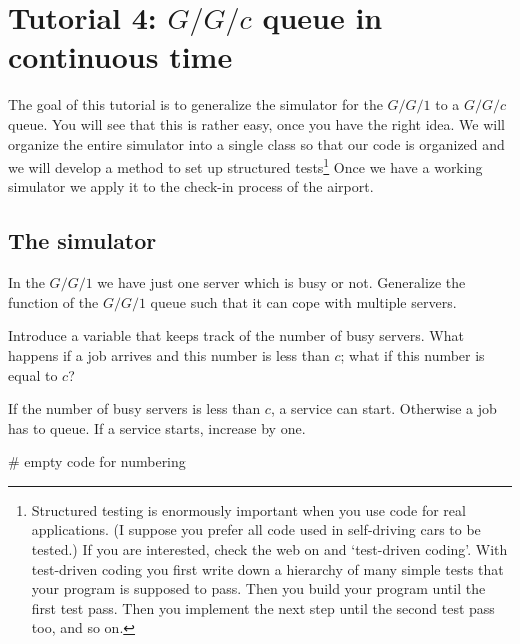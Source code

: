 \section{Tutorial 4: $G/G/c$ queue in continuous time}
\label{sec:ggc-continuous-time}

The goal of this tutorial is to  generalize the simulator for the $G/G/1$ to a $G/G/c$ queue. You will see that this is rather easy, once you have the right idea. We will organize the entire simulator into a single class so that our code is organized and we will develop a method to set up structured  tests\footnote{Structured testing is enormously important when you use code for real applications. (I suppose you prefer all code used in self-driving cars to be tested.)  If you are interested, check the web on   and `test-driven coding'. With test-driven coding you first write down a hierarchy of  many simple tests that your program is supposed to pass.  Then you build your program until the first test pass. Then you implement the next step until the second test pass too, and so on.} Once we have a working simulator we apply it to the check-in process of the airport.



\subsection{The simulator}
\label{sec:simulator}

\begin{exercise}
In the $G/G/1$ we have just one server which is busy or not.
  Generalize  the  function of the $G/G/1$ queue such that it can cope with multiple servers.

\begin{hint}
  Introduce a  variable that keeps track of the number of busy servers. What happens if a job arrives and this number is less than $c$; what if this number is equal to $c$?
\end{hint}
\begin{solution}
    If the number of busy servers is less than $c$, a service can start. Otherwise a job has to queue. If a service starts, increase  by one.

\begin{pyverbatim}
# empty code for numbering
\end{pyverbatim}
\end{solution}
\end{exercise}


